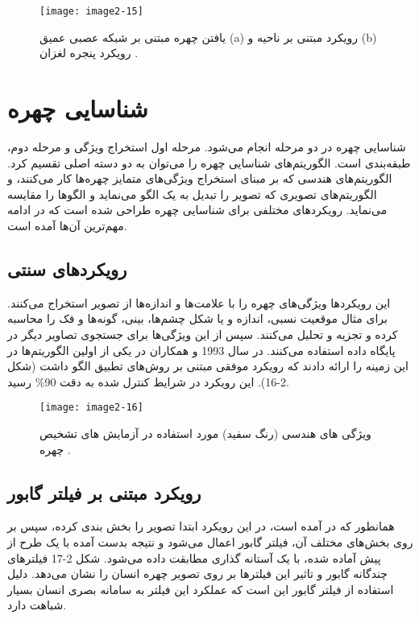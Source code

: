 \begin{figure}[h]
\centering
  \texttt{[image: image2-15]}
  \caption{یافتن چهره مبتنی بر شبکه عصبی عمیق (a) رویکرد مبتنی بر ناحیه و (b) رویکرد پنجره لغزان \cite{ref1}.}
  \label{image2-15}
\end{figure}

\section{شناسایی چهره}
شناسایی چهره در دو مرحله انجام می‌شود. مرحله اول استخراج ویژگی و مرحله دوم، طبقه‌بندی است. الگوریتم‌های شناسایی چهره را می‌توان به دو دسته اصلی تقسیم کرد. الگوریتم‌های هندسی که بر مبنای استخراج ویژگی‌های متمایز چهره‌ها کار می‌کنند، و الگوریتم‌های تصویری که تصویر را تبدیل به یک الگو می‌نماید و الگوها را مقایسه می‌نماید. رویکردهای مختلفی برای شناسایی چهره طراحی شده است که در ادامه مهم‌ترین آن‌ها آمده است.

\subsection{رویکرد‌های سنتی}
این رویکردها ویژگی‌های چهره را با علامت‌ها و اندازه‌ها از تصویر استخراج می‌کنند. برای مثال موقعیت نسبی، اندازه و یا شکل چشم‌ها، بینی، گونه‌‌ها و فک را محاسبه کرده و تجزیه و تحلیل می‌کنند. سپس از این ویژگی‌ها برای جستجوی تصاویر دیگر در پایگاه داده استفاده می‌کنند. در سال 1993  و همکاران در \cite{254061} یکی از اولین الگوریتم‌ها در این زمینه را ارائه دادند که رویکرد‌ موفقی مبتنی بر روش‌های تطبیق الگو داشت (شکل 2-16). این رویکرد در شرایط کنترل شده به دقت 90\% رسید.
 
\begin{figure}[h]
\centering
  \texttt{[image: image2-16]}
  \caption{ویژگی های هندسی (رنگ سفید) مورد استفاده در آزمایش های تشخیص چهره \cite{ref1}.}
  \label{image2-16}
\end{figure}

\subsection{رویکرد مبتنی بر فیلتر گابور ‌}
همانطور که در \cite{ABATE20071885} آمده است، در این رویکرد ابتدا تصویر را بخش بندی  کرده، سپس بر روی بخش‌های مختلف آن، فیلتر گابور اعمال می‌شود و نتیجه بدست آمده با یک طرح از پیش آماده شده، با یک آستانه گذاری مطابقت داده می‌شود. شکل 2-17 فیلترهای چندگانه گابور  و تاثیر این فیلترها بر روی تصویر چهره انسان را نشان می‌دهد. دلیل استفاده از فیلتر گابور این است که عملکرد این فیلتر به سامانه بصری انسان بسیار شباهت دارد. 
 	 
